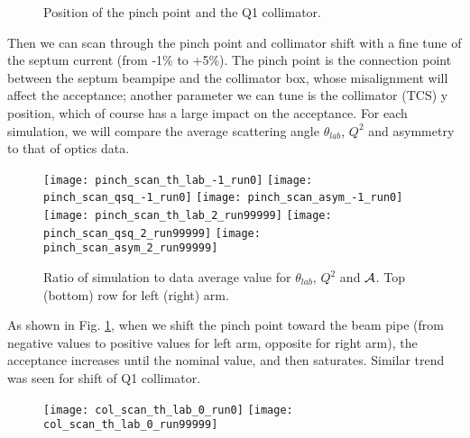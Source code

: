 \begin{figure}[H]
    \centering
    \caption{Position of the pinch point and the Q1 collimator.}
\end{figure}
Then we can scan through the pinch point and collimator shift with a fine tune
of the septum current (from -1\% to +5\%). The pinch point is the connection point
between the septum beampipe and the collimator box, whose misalignment will affect
the acceptance; another parameter we can tune is the collimator (TCS) y position,
which of course has a large impact on the acceptance. For each simulation, we
will compare the average scattering angle $\theta_{lab}$, $Q^2$ and asymmetry to
that of optics data.

\begin{figure}[H]
    \centering
    \texttt{[image: pinch\_scan\_th\_lab\_-1\_run0]}
    \texttt{[image: pinch\_scan\_qsq\_-1\_run0]}
    \texttt{[image: pinch\_scan\_asym\_-1\_run0]}
    \texttt{[image: pinch\_scan\_th\_lab\_2\_run99999]}
    \texttt{[image: pinch\_scan\_qsq\_2\_run99999]}
    \texttt{[image: pinch\_scan\_asym\_2\_run99999]}
    \caption{Ratio of simulation to data average value for 
    $\theta_{lab}$, $Q^2$ and $\mathcal{A}$. Top (bottom) row for left (right) arm.
    }
    \label{fig:pinch_scan}
\end{figure}

As shown in Fig. \ref{fig:pinch_scan}, when we shift the pinch point toward the
beam pipe (from negative values to positive values for left arm, opposite for 
right arm), the acceptance increases until the nominal value, and then saturates. 
Similar trend was seen for shift of Q1 collimator.
\begin{figure}[H]
    \centering
    \texttt{[image: col\_scan\_th\_lab\_0\_run0]}
    \texttt{[image: col\_scan\_th\_lab\_0\_run99999]}
\end{figure}

